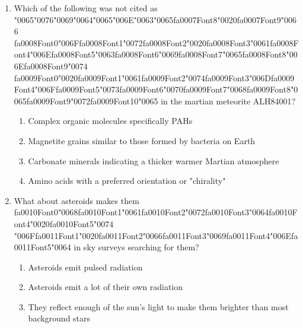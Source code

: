 \documentclass[12pt]{article}
\begin{document}
\begin{enumerate}[label=\arabic*.]
\item Which of the following was not cited as {\char"0065}{\char"0076}{\char"0069}{\char"0064}{\char"0065}{\char"006E}{\char"0063}{\char"0065}{\csname fa0007Font8\endcsname\char"0020}{\csname fa0007Font9\endcsname\char"0066} {\csname fa0008Font0\endcsname\char"006F}{\csname fa0008Font1\endcsname\char"0072}{\csname fa0008Font2\endcsname\char"0020}{\csname fa0008Font3\endcsname\char"0061}{\csname fa0008Font4\endcsname\char"006E}{\csname fa0008Font5\endcsname\char"0063}{\csname fa0008Font6\endcsname\char"0069}{\csname fa0008Font7\endcsname\char"0065}{\csname fa0008Font8\endcsname\char"006E}{\csname fa0008Font9\endcsname\char"0074} {\csname fa0009Font0\endcsname\char"0020}{\csname fa0009Font1\endcsname\char"0061}{\csname fa0009Font2\endcsname\char"0074}{\csname fa0009Font3\endcsname\char"006D}{\csname fa0009Font4\endcsname\char"006F}{\csname fa0009Font5\endcsname\char"0073}{\csname fa0009Font6\endcsname\char"0070}{\csname fa0009Font7\endcsname\char"0068}{\csname fa0009Font8\endcsname\char"0065}{\csname fa0009Font9\endcsname\char"0072}{\csname fa0009Font10\endcsname\char"0065} in the martian meteorite
ALH84001?
\begin{enumerate}[label=(\alph*)]
    \item Complex organic molecules specifically PAHs
    \item Magnetite grains similar to those formed by bacteria on Earth
    \item Carbonate minerals indicating a thicker warmer Martian atmosphere
    \item Amino acids with a preferred orientation or "chirality"
\end{enumerate}
\item What about asteroids makes them {\csname fa0010Font0\endcsname\char"0068}{\csname fa0010Font1\endcsname\char"0061}{\csname fa0010Font2\endcsname\char"0072}{\csname fa0010Font3\endcsname\char"0064}{\csname fa0010Font4\endcsname\char"0020}{\csname fa0010Font5\endcsname\char"0074} {\char"006F}{\csname fa0011Font1\endcsname\char"0020}{\csname fa0011Font2\endcsname\char"0066}{\csname fa0011Font3\endcsname\char"0069}{\csname fa0011Font4\endcsname\char"006E}{\csname fa0011Font5\endcsname\char"0064} in sky surveys searching for them?
\begin{enumerate}[label=(\alph*)]
    \item Asteroids emit pulsed radiation
    \item Asteroids emit a lot of their own radiation
    \item They reflect enough of the sun's light to make them brighter than most background stars

\end{enumerate}
\end{enumerate}
\end{document}
